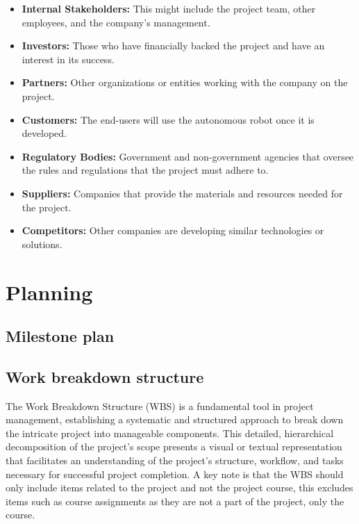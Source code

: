 \documentclass[10pt]{projectdoc}
\begin{document}
\begin{itemize}
\item \textbf{Internal Stakeholders:} This might include the project team, other employees, and the company's management.
\item \textbf{Investors:} Those who have financially backed the project and have an interest in its success.
\item \textbf{Partners:} Other organizations or entities working with the company on the project.
\item \textbf{Customers:} The end-users will use the autonomous robot once it is developed.
\item \textbf{Regulatory Bodies:} Government and non-government agencies that oversee the rules and regulations that the project must adhere to.
\item \textbf{Suppliers:} Companies that provide the materials and resources needed for the project.
\item \textbf{Competitors:} Other companies are developing similar technologies or solutions.
\end{itemize}

\section{Planning}
\subsection{Milestone plan}

\subsection{Work breakdown structure}
The Work Breakdown Structure (WBS) is a fundamental tool in project management, establishing a systematic and structured approach to break down the intricate project into manageable components. This detailed, hierarchical decomposition of the project's scope presents a visual or textual representation that facilitates an understanding of the project's structure, workflow, and tasks necessary for successful project completion. A key note is that the WBS should only include items related to the project and not the project course, this excludes items such as course assignments as they are not a part of the project, only the course.
\end{document}
